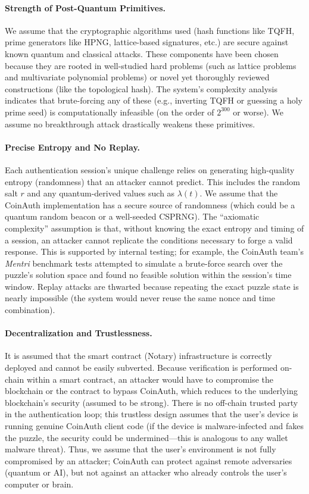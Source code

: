 \documentclass[10pt,letterpaper]{article}
\begin{document}
\paragraph{Strength of Post-Quantum Primitives.} We assume that the cryptographic algorithms used (hash functions like TQFH, prime generators like HPNG, lattice-based signatures, etc.) are secure against known quantum and classical attacks. These components have been chosen because they are rooted in well-studied hard problems (such as lattice problems and multivariate polynomial problems) or novel yet thoroughly reviewed constructions (like the topological hash). The system’s complexity analysis indicates that brute-forcing any of these (e.g., inverting TQFH or guessing a holy prime seed) is computationally infeasible (on the order of \( 2^{300} \) or worse). We assume no breakthrough attack drastically weakens these primitives.

\paragraph{Precise Entropy and No Replay.} Each authentication session’s unique challenge relies on generating high-quality entropy (randomness) that an attacker cannot predict. This includes the random salt \( r \) and any quantum-derived values such as \( \lambda(t) \). We assume that the CoinAuth implementation has a secure source of randomness (which could be a quantum random beacon or a well-seeded CSPRNG). The “axiomatic complexity” assumption is that, without knowing the exact entropy and timing of a session, an attacker cannot replicate the conditions necessary to forge a valid response. This is supported by internal testing; for example, the CoinAuth team’s \emph{Mentri} benchmark tests attempted to simulate a brute-force search over the puzzle’s solution space and found no feasible solution within the session's time window. Replay attacks are thwarted because repeating the exact puzzle state is nearly impossible (the system would never reuse the same nonce and time combination).

\paragraph{Decentralization and Trustlessness.} It is assumed that the smart contract (Notary) infrastructure is correctly deployed and cannot be easily subverted. Because verification is performed on-chain within a smart contract, an attacker would have to compromise the blockchain or the contract to bypass CoinAuth, which reduces to the underlying blockchain’s security (assumed to be strong). There is no off-chain trusted party in the authentication loop; this trustless design assumes that the user’s device is running genuine CoinAuth client code (if the device is malware-infected and fakes the puzzle, the security could be undermined—this is analogous to any wallet malware threat). Thus, we assume that the user’s environment is not fully compromised by an attacker; CoinAuth can protect against remote adversaries (quantum or AI), but not against an attacker who already controls the user’s computer or brain.
\end{document}
